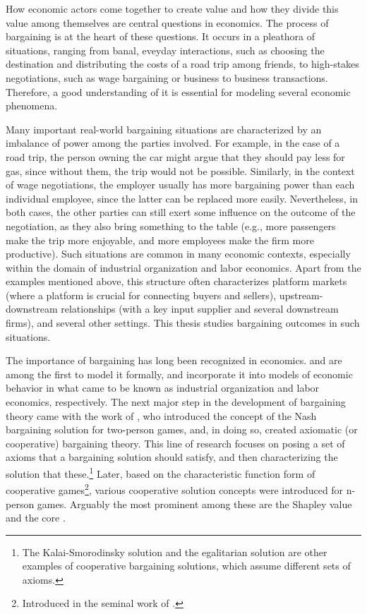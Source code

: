 How economic actors come together to create value and how they divide this value among themselves are central questions in economics.
The process of bargaining is at the heart of these questions.
It occurs in a pleathora of situations, ranging from banal, eveyday interactions, such as choosing the destination and distributing the costs of a road trip among friends, to high-stakes negotiations, such as wage bargaining or business to business transactions.
Therefore, a good understanding of it is essential for modeling several economic phenomena.

Many important real-world bargaining situations are characterized by an imbalance of power among the parties involved.
For example, in the case of a road trip, the person owning the car might argue that they should pay less for gas, since without them, the trip would not be possible.
Similarly, in the context of wage negotiations, the employer usually has more bargaining power than each individual employee, since the latter can be replaced more easily.
Nevertheless, in both cases, the other parties can still exert some influence on the outcome of the negotiation, as they also bring something to the table (e.g., more passengers make the trip more enjoyable, and more employees make the firm more productive).
Such situations are common in many economic contexts, especially within the domain of industrial organization and labor economics.
Apart from the examples mentioned above, this structure often characterizes platform markets (where a platform is crucial for connecting buyers and sellers), upstream-downstream relationships (with a key input supplier and several downstream firms), and several other settings.
This thesis studies bargaining outcomes in such situations.

The importance of bargaining has long been recognized in economics.
\textcite{zeuthen1930problems} and \textcite{hicks1932theory} are among the first to model it formally, and incorporate it into models of economic behavior in what came to be known as industrial organization and labor economics, respectively.
The next major step in the development of bargaining theory came with the work of \textcite{nash1950bargaining}, who introduced the concept of the Nash bargaining solution for two-person games, and, in doing so, created axiomatic (or cooperative) bargaining theory.
This line of research focuses on posing a set of axioms that a bargaining solution should satisfy, and then characterizing the solution that these.\footnote{
    The Kalai-Smorodinsky solution \parencite{kalai1975other} and the egalitarian solution \parencite{kalai1977proportional} are other examples of cooperative bargaining solutions, which assume different sets of axioms.
}
Later, based on the characteristic function form of cooperative games\footnote{
    Introduced in the seminal work of \textcite{neumann1944theory}.
}, various cooperative solution concepts were introduced for n-person games.
Arguably the most prominent among these are the Shapley value \parencite{shapley1953value} and the core \parencite{gillies1959solutions}.

